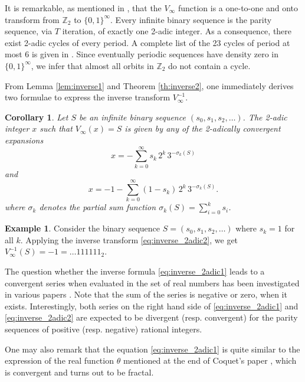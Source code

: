 \documentclass[12pt]{article}
\newtheorem{corollary}{Corollary}
\theoremstyle{definition}
\newtheorem{example}{Example}
\begin{document}
It is remarkable, as mentioned in \cite{Lag85}, that the $V_{\infty}$ function is a one-to-one and onto transform from $\mathbb Z_2$ to $\{0, 1\}^{\infty}$. Every infinite binary sequence is the parity sequence, via $T$ iteration, of exactly one 2-adic integer. As a consequence, there exist 2-adic cycles of every period. A complete list of the 23 cycles of period at most 6 is given in \cite{Lag90}. Since eventually periodic sequences have density zero in $\{0, 1\}^{\infty}$, we infer that almost all orbits in $\mathbb Z_2$ do not contain a cycle.

From Lemma \ref{lem:inverse1} and Theorem \ref{th:inverse2}, one immediately derives two formulae to express the inverse transform $V_{\infty}^{-1}$.

\begin{corollary}
\label{cor:inverse_2adic}
Let $S$ be an infinite binary sequence $\left( s_0, s_1, s_2, \ldots \right)$. The 2-adic integer $x$ such that $V_{\infty}(x) = S$ is given by any of the 2-adically convergent expansions
\begin{equation} \label{eq:inverse_2adic1}
x = - \sum_{k=0}^{\infty} s_{k} \, 2^{k} \, 3^{-\sigma_{k}(S)}
\end{equation}
and
\begin{equation} \label{eq:inverse_2adic2}
x = -1 - \sum_{k=0}^{\infty} (1 -s_{k}) \, 2^{k} \, 3^{-\sigma_{k}(S)}.
\end{equation}
where $\sigma_{k}$ denotes the partial sum function $\sigma_{k}(S)=\sum_{i=0}^{k}s_{i}$.\end{corollary}

\begin{example}\label{ex:inverse_2adic}
Consider the binary sequence $S = \left( s_0, s_1, s_2, \ldots \right)$ where $s_k = 1$ for all $k$. Applying the inverse transform \eqref{eq:inverse_2adic2}, we get $V_{\infty}^{-1}(S) = -1 = \ldots111111_{2}$.
\end{example}

The question whether the inverse formula \eqref{eq:inverse_2adic1} leads to a convergent series when evaluated in the set of real numbers has been investigated in various papers \cite{Edg12,Lop09,Mat84}. Note that the sum of the series is negative or zero, when it exists. Interestingly, both series on the right hand side of \eqref{eq:inverse_2adic1} and \eqref{eq:inverse_2adic2} are expected to be divergent (resp. convergent) for the parity sequences of positive (resp. negative) rational integers. 

One may also remark that the equation \eqref{eq:inverse_2adic1} is quite similar to the expression of the real function $\theta$ mentioned at the end of Coquet's paper \cite[\S 7]{Coq83}, which is convergent and turns out to be fractal.
\end{document}
